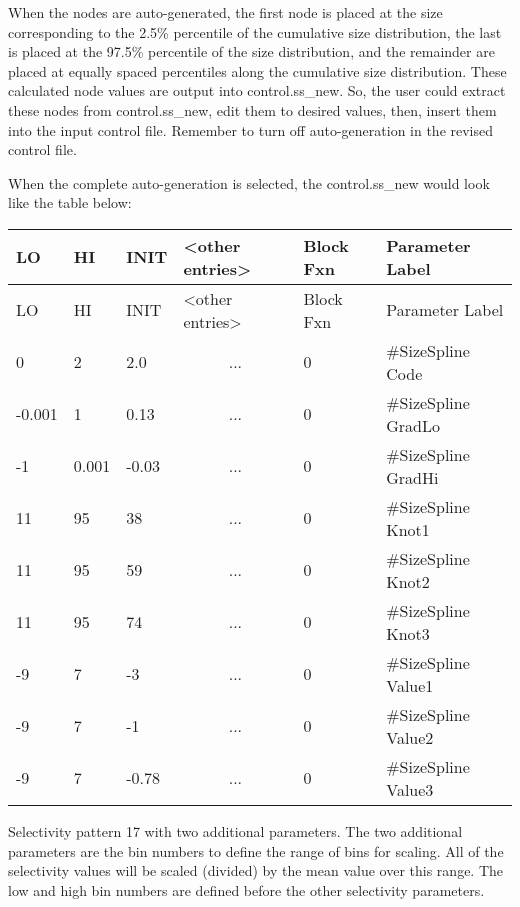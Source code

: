 When the nodes are auto-generated, the first node is placed at the size corresponding to the 2.5\% percentile of the cumulative size distribution, the last is placed at the 97.5\% percentile of the size distribution, and the remainder are placed at equally spaced percentiles along the cumulative size distribution.  These calculated node values are output into control.ss\_new.  So, the user could extract these nodes from control.ss\_new, edit them to desired values, then, insert them into the input control file.  Remember to turn off auto-generation in the revised control file.
	
When the complete auto-generation is selected, the control.ss\_new would look like the table below:	

\begin{longtable}{p{1cm} p{1cm} p{1cm} p{2.9cm}  p{1.9cm}  p{4.2cm}}
	\hline
	LO \Tstrut & HI & INIT  &  <other entries> & Block Fxn & Parameter Label\Bstrut\\
	\hline
	\endfirsthead

	\hline
	LO \Tstrut & HI & INIT & <other entries> & Block Fxn & Parameter Label\Bstrut\\
	\hline
	\endhead

	0 \Tstrut &     2  &   2.0 & \multicolumn{1}{c}{...} & 0 & \#SizeSpline Code\\
	-0.001    & 	 1 &  0.13 & \multicolumn{1}{c}{...} & 0 & \#SizeSpline GradLo\\
	-1        & 0.001  & -0.03 & \multicolumn{1}{c}{...} & 0 & \#SizeSpline GradHi\\
	11        & 	95 & 	38 & \multicolumn{1}{c}{...} & 0 & \#SizeSpline Knot1\\
	11        & 	95 & 	59 & \multicolumn{1}{c}{...} & 0 & \#SizeSpline Knot2\\
	11        & 	95 & 	74 & \multicolumn{1}{c}{...} & 0 & \#SizeSpline Knot3\\
	-9        & 	 7 & 	-3 & \multicolumn{1}{c}{...} & 0 & \#SizeSpline Value1\\
	-9        &   	 7 & 	-1 & \multicolumn{1}{c}{...} & 0 & \#SizeSpline Value2\\
	-9        & 	 7 & -0.78 & \multicolumn{1}{c}{...} & 0 & \#SizeSpline Value3 \Bstrut\\
	\hline
\end{longtable}


Selectivity pattern 17 with two additional parameters. The two additional parameters are the bin numbers to define the range of bins for scaling. All of the selectivity values will be scaled (divided) by the mean value over this range. The low and high bin numbers are defined before the other selectivity parameters.

